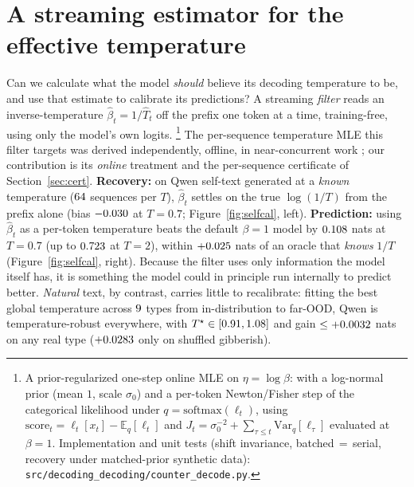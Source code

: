 \documentclass[11pt]{article}
\begin{document}
\section{A streaming estimator for the effective temperature}\label{sec:filter}
Can we calculate what the model \emph{should} believe its decoding temperature to
be, and use that estimate to calibrate its predictions?
A streaming \emph{filter} reads an inverse-temperature $\hat\beta_t = 1/\hat T_t$
off the prefix one token at a time, training-free, using only the model's own
logits.%
\footnote{A prior-regularized one-step online MLE on $\eta=\log\beta$: with a
log-normal prior (mean $1$, scale $\sigma_0$) and a per-token Newton/Fisher step
of the categorical likelihood under $q=\mathrm{softmax}(\ell_t)$, using
$\mathrm{score}_t=\ell_t[x_t]-\mathbb{E}_q[\ell_t]$ and
$J_t=\sigma_0^{-2}+\sum_{\tau\le t}\mathrm{Var}_q[\ell_\tau]$ evaluated at
$\beta{=}1$. Implementation and unit tests (shift invariance,
batched\,$=$\,serial, recovery under matched-prior synthetic data):
\texttt{src/decoding\_decoding/counter\_decode.py}.}
The per-sequence temperature MLE this filter targets was derived independently,
offline, in near-concurrent work \citep{mikhaylovskiy2026temperature}; our
contribution is its \emph{online} treatment and the per-sequence certificate of
Section~\ref{sec:cert}.
\textbf{Recovery:} on Qwen self-text generated at a \emph{known} temperature
($64$ sequences per $T$), $\hat\beta_t$ settles on the true $\log(1/T)$ from
the prefix alone (bias $-0.030$ at $T{=}0.7$;
Figure~\ref{fig:selfcal}, left).
\textbf{Prediction:} using $\hat\beta_t$ as a per-token temperature beats the
default $\beta{=}1$ model by $0.108$ nats at $T{=}0.7$ (up to
$0.723$ at $T{=}2$), within $+0.025$ nats of an oracle that
\emph{knows} $1/T$ (Figure~\ref{fig:selfcal}, right).
Because the filter uses only information the model itself has, it is something the
model could in principle run internally to predict better.
\emph{Natural} text, by contrast, carries little to recalibrate: fitting the best
global temperature across $9$ types from in-distribution to far-OOD,
Qwen is temperature-robust everywhere, with
$T^\star\in[0.91,1.08]$ and gain $\le+0.0032$
nats on any real type ($+0.0283$ only on shuffled gibberish).
\end{document}
